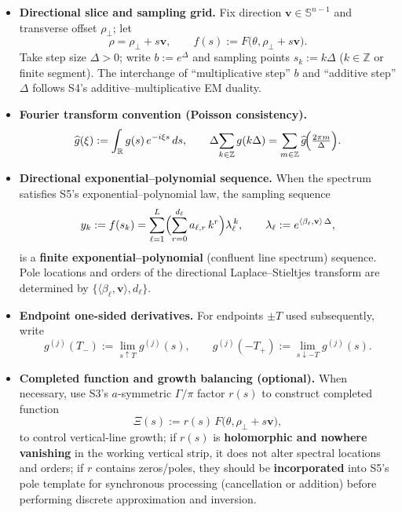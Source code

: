 \documentclass[11pt,a4paper]{article}
\theoremstyle{remark}
\begin{document}
\begin{itemize}
\item \textbf{Directional slice and sampling grid.} Fix direction $\mathbf{v}\in\mathbb{S}^{n-1}$ and transverse offset $\rho_\perp$; let
\begin{equation}
\rho=\rho_\perp+s\mathbf{v},\qquad f(s):=F\bigl(\theta,\rho_\perp+s\mathbf{v}\bigr).
\end{equation}
Take step size $\Delta>0$; write $b:=e^{\Delta}$ and sampling points $s_k:=k\Delta$ ($k\in\mathbb{Z}$ or finite segment). The interchange of ``multiplicative step'' $b$ and ``additive step'' $\Delta$ follows S4's additive--multiplicative EM duality.

\item \textbf{Fourier transform convention (Poisson consistency).}
\begin{equation}
\widehat{g}(\xi):=\int_{\mathbb{R}} g(s)\,e^{-i\xi s}\,ds,\qquad
\Delta\!\sum_{k\in\mathbb{Z}} g(k\Delta)=\sum_{m\in\mathbb{Z}}\widehat{g}\!\Bigl(\tfrac{2\pi m}{\Delta}\Bigr).
\end{equation}

\item \textbf{Directional exponential--polynomial sequence.} When the spectrum satisfies S5's exponential--polynomial law, the sampling sequence
\begin{equation}
y_k:=f(s_k)=\sum_{\ell=1}^L\Bigl(\sum_{r=0}^{d_\ell} a_{\ell,r}\,k^r\Bigr)\lambda_\ell^{\,k},
\qquad \lambda_\ell:=e^{\langle\beta_\ell,\mathbf{v}\rangle\,\Delta},
\end{equation}
is a \textbf{finite exponential--polynomial} (confluent line spectrum) sequence. Pole locations and orders of the directional Laplace--Stieltjes transform are determined by $\{\langle\beta_\ell,\mathbf{v}\rangle,d_\ell\}$.

\item \textbf{Endpoint one-sided derivatives.} For endpoints $\pm T$ used subsequently, write
\begin{equation}
g^{(j)}(T_-):=\lim_{s\uparrow T}g^{(j)}(s),\qquad
g^{(j)}(-T_+):=\lim_{s\downarrow -T}g^{(j)}(s).
\end{equation}

\item \textbf{Completed function and growth balancing (optional).} When necessary, use S3's $a$-symmetric $\Gamma/\pi$ factor $r(s)$ to construct completed function
\begin{equation}
\Xi(s):=r(s)\,F\bigl(\theta,\rho_\perp+s\mathbf{v}\bigr),
\end{equation}
to control vertical-line growth; if $r(s)$ is \textbf{holomorphic and nowhere vanishing} in the working vertical strip, it does not alter spectral locations and orders; if $r$ contains zeros/poles, they should be \textbf{incorporated} into S5's pole template for synchronous processing (cancellation or addition) before performing discrete approximation and inversion.


\end{itemize}
\end{document}

